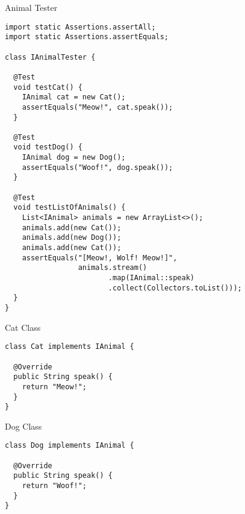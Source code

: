 \begin{cl}{Animal Tester}
\begin{lstlisting}[language=MyJava]
import static Assertions.assertAll;
import static Assertions.assertEquals;

class IAnimalTester {
  
  @Test
  void testCat() {
    IAnimal cat = new Cat();
    assertEquals("Meow!", cat.speak());
  }

  @Test
  void testDog() {
    IAnimal dog = new Dog();
    assertEquals("Woof!", dog.speak());
  }

  @Test
  void testListOfAnimals() {
    List<IAnimal> animals = new ArrayList<>();
    animals.add(new Cat());
    animals.add(new Dog());
    animals.add(new Cat());
    assertEquals("[Meow!, Wolf! Meow!]", 
                 animals.stream()
                        .map(IAnimal::speak)
                        .collect(Collectors.toList()));
  }
}
\end{lstlisting}
\end{cl}

\begin{cl}{Cat Class}
\begin{lstlisting}[language=MyJava]
class Cat implements IAnimal {

  @Override
  public String speak() {
    return "Meow!";
  }
}
\end{lstlisting}
\end{cl}

\begin{cl}{Dog Class}
\begin{lstlisting}[language=MyJava]
class Dog implements IAnimal {

  @Override
  public String speak() {
    return "Woof!";
  }
}
\end{lstlisting}
\end{cl}


